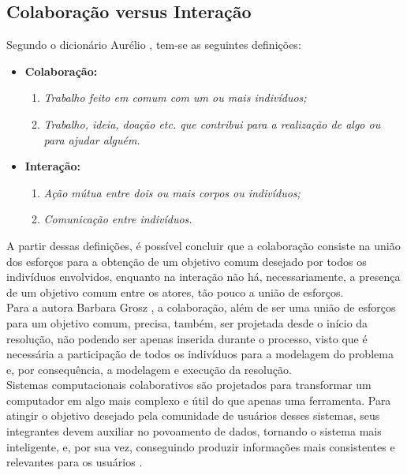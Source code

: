 \subsection{Colaboração versus Interação}
\null \quad Segundo o dicionário Aurélio \cite{aurelio}, tem-se as seguintes definições:%
\begin{itemize}
  \item \textbf{Colaboração:}
  \begin{enumerate}
    \item \textit{Trabalho feito em comum com um ou mais indivíduos;}
    \item \textit{Trabalho, ideia, doação etc. que contribui para a realização de algo ou para ajudar alguém.}
  \end{enumerate}

  \item \textbf{Interação:}
  \begin{enumerate}
    \item \textit{Ação mútua entre dois ou mais corpos ou indivíduos;}
    \item \textit{Comunicação entre indivíduos.}
  \end{enumerate}
\end{itemize}
 \null
\quad A partir dessas definições, é possível concluir que a colaboração consiste na união dos esforços
para a obtenção de um objetivo comum desejado por todos os indivíduos envolvidos, enquanto na interação
não há, necessariamente, a presença de um objetivo comum entre os atores, tão pouco a união de esforços. \\ \null \quad
Para a autora Barbara Grosz \cite{cbarbara}, a colaboração, além de ser uma união de esforços para um objetivo comum,
precisa, também, ser projetada desde o início da resolução, não podendo ser apenas inserida durante o processo, visto que é
necessária a participação de todos os indivíduos para a modelagem do problema e, por consequência, a modelagem e execução da resolução.
\\
\null \quad Sistemas computacionais colaborativos são projetados para transformar um computador em algo mais complexo e útil do que apenas uma ferramenta.
Para atingir o objetivo desejado pela comunidade de usuários desses sistemas, seus integrantes devem auxiliar no povoamento de dados,
tornando o sistema mais inteligente, e, por sua vez, conseguindo produzir informações mais consistentes e relevantes para os usuários \cite{cbarbara}.

